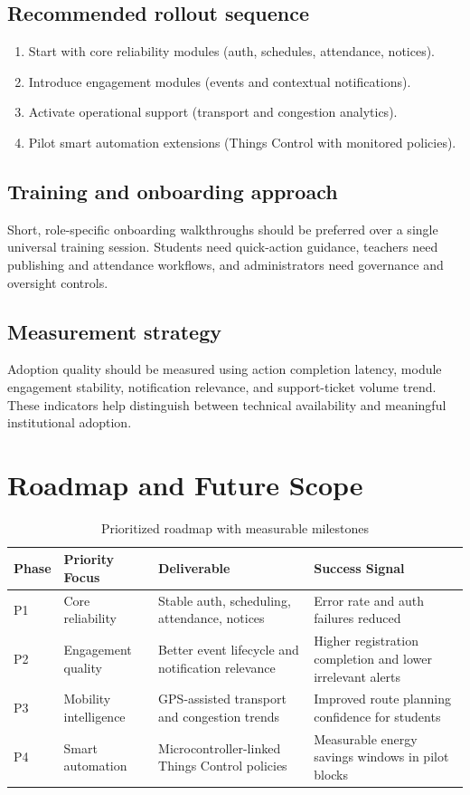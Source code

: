\documentclass[conference]{IEEEtran}
\begin{document}
\subsection{Recommended rollout sequence}
\begin{enumerate}
    \item Start with core reliability modules (auth, schedules, attendance, notices).
    \item Introduce engagement modules (events and contextual notifications).
    \item Activate operational support (transport and congestion analytics).
    \item Pilot smart automation extensions (Things Control with monitored policies).
\end{enumerate}

\subsection{Training and onboarding approach}
Short, role-specific onboarding walkthroughs should be preferred over a single universal training session. Students need quick-action guidance, teachers need publishing and attendance workflows, and administrators need governance and oversight controls.

\subsection{Measurement strategy}
Adoption quality should be measured using action completion latency, module engagement stability, notification relevance, and support-ticket volume trend. These indicators help distinguish between technical availability and meaningful institutional adoption.

\section{Roadmap and Future Scope}
\begin{table}[!t]
\caption{Prioritized roadmap with measurable milestones}
\centering
\begin{tabularx}{\textwidth}{@{}p{1.1cm}p{3.8cm}p{4.8cm}p{3.5cm}@{}}
\toprule
\textbf{Phase} & \textbf{Priority Focus} & \textbf{Deliverable} & \textbf{Success Signal} \\
\midrule
P1 & Core reliability & Stable auth, scheduling, attendance, notices & Error rate and auth failures reduced \\
P2 & Engagement quality & Better event lifecycle and notification relevance & Higher registration completion and lower irrelevant alerts \\
P3 & Mobility intelligence & GPS-assisted transport and congestion trends & Improved route planning confidence for students \\
P4 & Smart automation & Microcontroller-linked Things Control policies & Measurable energy savings windows in pilot blocks \\
\bottomrule
\end{tabularx}
\label{tab:roadmap}
\end{table}
\end{document}
